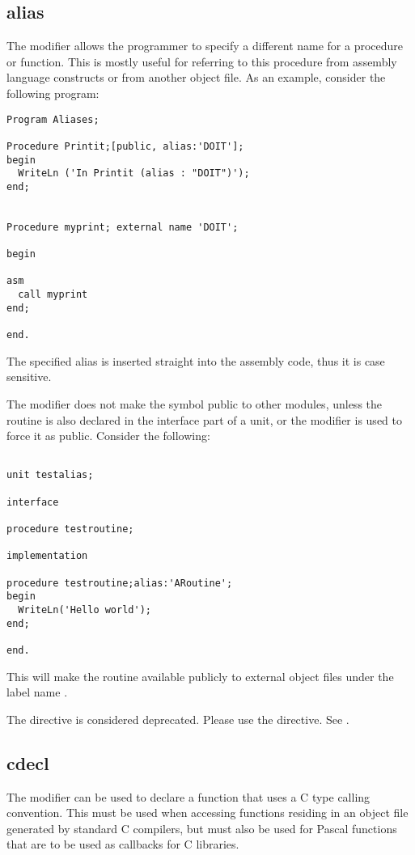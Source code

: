 \subsection{alias}
\label{se:alias}
The  modifier allows the programmer to specify a different name for a
procedure or function. This is mostly useful for referring to this procedure
from assembly language constructs or from another object file. As an example,
consider the following program:
\begin{verbatim}
Program Aliases;

Procedure Printit;[public, alias:'DOIT'];
begin
  WriteLn ('In Printit (alias : "DOIT")');
end;


Procedure myprint; external name 'DOIT';

begin

asm
  call myprint
end;

end.
\end{verbatim}
\begin{remark} The specified alias is inserted straight into the assembly
code, thus it is case sensitive.
\end{remark}
The  modifier does not make the symbol public to other modules,
unless the routine is also declared in the interface part of a unit, or
the  modifier is used to force it as public. Consider the
following:
\begin{verbatim}

unit testalias;

interface

procedure testroutine;

implementation

procedure testroutine;alias:'ARoutine';
begin
  WriteLn('Hello world');
end;

end.
\end{verbatim}
This will make the routine  available publicly to
external object files under the label name .

\begin{remark}
The  directive is considered deprecated. Please use the
 directive. See .
\end{remark}

\subsection{cdecl}
\label{se:cdecl}
The  modifier can be used to declare a function that uses a C
type calling convention. This must be used when accessing functions residing in
an object file generated by standard C compilers, but must also be used for
Pascal functions that are to be used as callbacks for C libraries.

